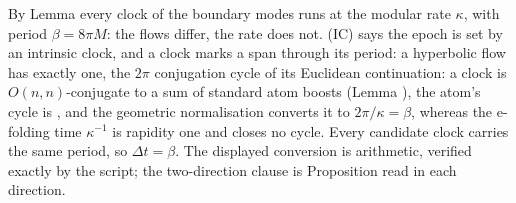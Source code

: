 By Lemma  every clock of the boundary modes runs at the modular rate $\kappa$, with period $\beta = 8\pi M$: the flows differ, the rate does not. (IC) says the epoch is set by an intrinsic clock, and a clock marks a span through its period: a hyperbolic flow has exactly one, the $2\pi$ conjugation cycle of its Euclidean continuation: a clock is $O(n,n)$-conjugate to a sum of standard atom boosts (Lemma ), the atom's cycle is \cite[Prop.~7.21(1)]{ButlerT5}, and the geometric normalisation converts it to $2\pi/\kappa = \beta$, whereas the e-folding time $\kappa^{-1}$ is rapidity one and closes no cycle. Every candidate clock carries the same period, so $\Delta t = \beta$. The displayed conversion is arithmetic, verified exactly by the script; the two-direction clause is Proposition  read in each direction.
